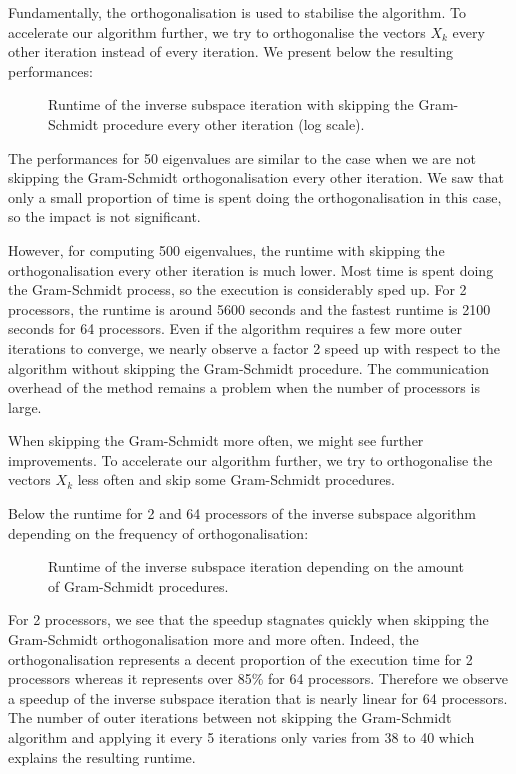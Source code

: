 Fundamentally, the orthogonalisation is used to stabilise the algorithm.
\ifthesis
 To accelerate our algorithm further, we try to orthogonalise the vectors \(X_k\) every other iteration instead of every iteration.
 We present below the resulting performances:
 
 \begin{figure}[H]
   \centering
   
   \caption{Runtime of the inverse subspace iteration with skipping the Gram-Schmidt procedure every other iteration (log scale).}
 \end{figure}
 
 The performances for 50 eigenvalues are similar to the case when we are not skipping the Gram-Schmidt orthogonalisation every other iteration.
 We saw that only a small proportion of time is spent doing the orthogonalisation in this case, so the impact is not significant.
 
 However, for computing 500 eigenvalues, the runtime with skipping the orthogonalisation every other iteration is much lower.
 Most time is spent doing the Gram-Schmidt process, so the execution is considerably sped up.
 For 2 processors, the runtime is around 5600 seconds and the fastest runtime is 2100 seconds for 64 processors.
 Even if the algorithm requires a few more outer iterations to converge, we nearly observe a factor 2 speed up with respect to the algorithm without skipping the Gram-Schmidt procedure.
 The communication overhead of the method remains a problem when the number of processors is large.

 When skipping the Gram-Schmidt more often, we might see further improvements.
\else
 To accelerate our algorithm further, we try to orthogonalise the vectors \(X_k\) less often and skip some Gram-Schmidt procedures.
\fi

Below the runtime for 2 and 64 processors of the inverse subspace algorithm depending on the frequency of orthogonalisation:

\begin{figure}[H]
  \centering
  
  \caption{Runtime of the inverse subspace iteration depending on the amount of Gram-Schmidt procedures.}
\end{figure}

For 2 processors, we see that the speedup stagnates quickly when skipping the Gram-Schmidt orthogonalisation more and more often.
Indeed, the orthogonalisation represents a decent proportion of the execution time for 2 processors whereas it represents over 85\% for 64 processors.
Therefore we observe a speedup of the inverse subspace iteration that is nearly linear for 64 processors.
The number of outer iterations between not skipping the Gram-Schmidt algorithm and applying it every 5 iterations only varies from 38 to 40 which explains the resulting runtime.
